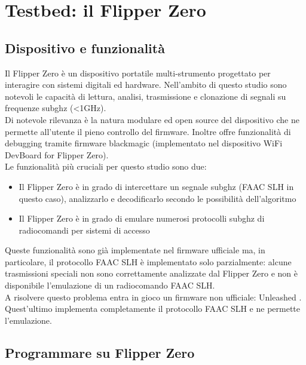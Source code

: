 \chapter{Testbed: il Flipper Zero}
\label{cha:testbed}

\section{Dispositivo e funzionalità}
\label{sec:device}

Il Flipper Zero è un dispositivo portatile multi-strumento progettato per interagire con sistemi digitali ed hardware. Nell'ambito di questo studio sono notevoli le capacità di lettura, analisi, trasmissione e clonazione di segnali su frequenze subghz (\textless1GHz).\\
Di notevole rilevanza è la natura modulare ed open source del dispositivo che ne permette all'utente il pieno controllo del firmware. Inoltre offre funzionalità di debugging tramite firmware blackmagic (implementato nel dispositivo WiFi DevBoard for Flipper Zero).\\
Le funzionalità più cruciali per questo studio sono due:
\begin{itemize}
  \item Il Flipper Zero è in grado di intercettare un segnale subghz (FAAC SLH in questo caso), analizzarlo e decodificarlo secondo le possibilità dell'algoritmo
  \item Il Flipper Zero è in grado di emulare numerosi protocolli subghz di radiocomandi per sistemi di accesso
\end{itemize}
Queste funzionalità sono già implementate nel firmware ufficiale \cite{off_firmware} ma, in particolare, il protocollo FAAC SLH è implementato solo parzialmente: alcune trasmissioni speciali non sono correttamente analizzate dal Flipper Zero e non è disponibile l'emulazione di un radiocomando FAAC SLH.\\
A risolvere questo problema entra in gioco un firmware non ufficiale: Unleashed \cite{firmware}. Quest'ultimo implementa completamente il protocollo FAAC SLH e ne permette l'emulazione.\\

\section{Programmare su Flipper Zero}
\label{sec:flip_prog}

